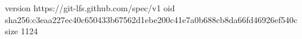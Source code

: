 version https://git-lfs.github.com/spec/v1
oid sha256:c3eaa227ec40c650433b67562d1ebe200c41e7a0b688cb8da66fd46926ef540c
size 1124
